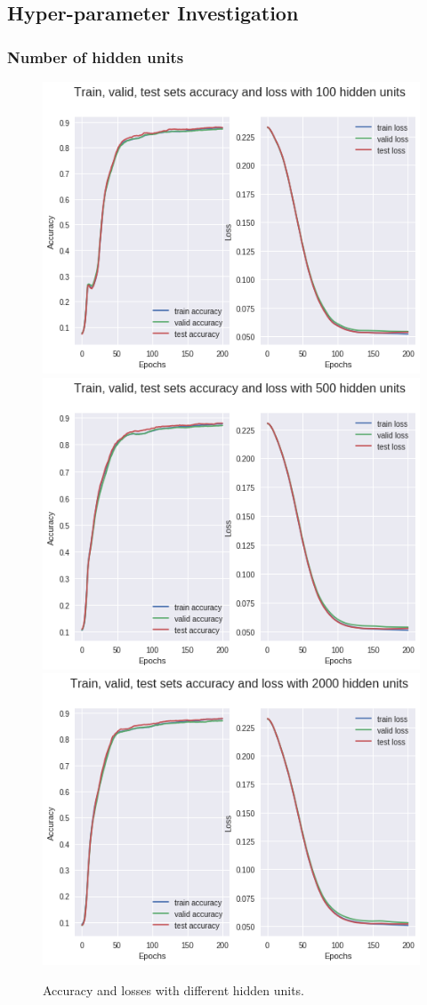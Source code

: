 \documentclass[10pt,letterpaper]{article}
\begin{document}
\subsection{Hyper-parameter Investigation}

\subsubsection{Number of hidden units}

\begin{figure}[H]
\centering

  \includegraphics[width=.5\linewidth]{img/p1_4_1.png}\hfill
  \includegraphics[width=.5\linewidth]{img/p1_4_2.png}\hfill
  \includegraphics[width=.5\linewidth]{img/p1_4_3.png}
  \caption{Accuracy and losses with different hidden units.}

\end{figure}
\end{document}
